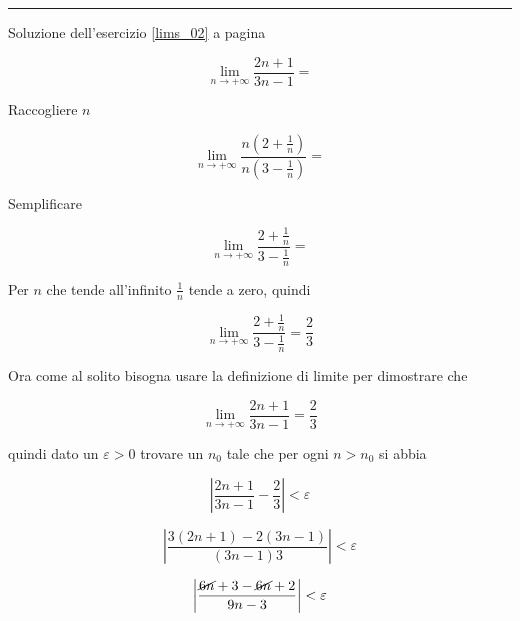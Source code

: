 \vspace{1cm}
\hrule
\vspace{1cm}



Soluzione dell'esercizio \ref{lims_02} a pagina \pageref{lims_02}\label{limss_02}

\begin{equation*}
\lim_{n \to +\infty}\frac{2n+1}{3n-1}=
\end{equation*}

Raccogliere $n$

\begin{equation*}
\lim_{n \to +\infty}\frac{n
\left( 
	2+\frac{1}{n}
\right)
}{n
\left( 
	3-\frac{1}{n}
\right)
}=
\end{equation*}

Semplificare

\begin{equation*}
\lim_{n \to +\infty}\frac{
	2+\frac{1}{n}
}{
	3-\frac{1}{n}
}=
\end{equation*}

Per $n$ che tende all'infinito $\frac{1}{n}$ tende a zero, quindi


\begin{equation*}
\lim_{n \to +\infty}\frac{
	2+\frac{1}{n}
}{
	3-\frac{1}{n}
}=\frac{2}{3}
\end{equation*}

Ora come al solito bisogna usare la definizione di limite per dimostrare che 

\begin{equation*}
\lim_{n \to +\infty}\frac{2n+1}{3n-1}=\frac{2}{3}
\end{equation*}

quindi dato un $\varepsilon > 0$ trovare un $n_0$ tale che per ogni $n>n_0$ si abbia

\begin{equation*}
\left|
\frac{2n+1}{3n-1}-\frac{2}{3}
\right| < \varepsilon
\end{equation*}

\begin{equation*}
\left|
\frac{
3(2n+1)-2(3n-1)
}{
(3n-1)3
}
\right| < \varepsilon
\end{equation*}

\begin{equation*}
\left|
\frac{
\cancel{6n}+3-\cancel{6n}+2
}{
9n-3
}
\right| < \varepsilon
\end{equation*}

